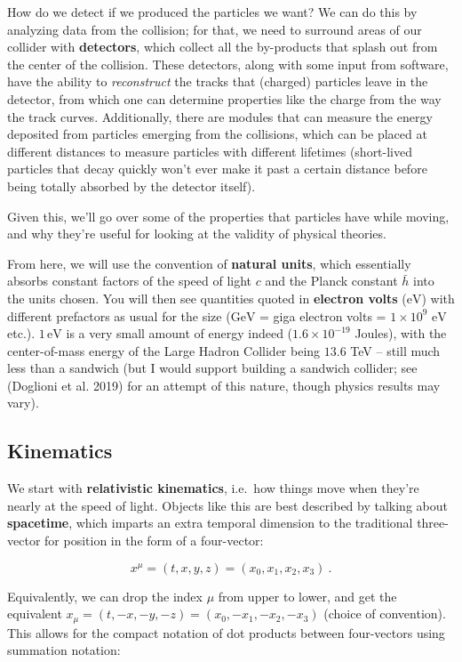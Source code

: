 \documentclass[
  11pt,
  numbers=noendperiod]{book}
\begin{document}
How do we detect if we produced the particles we want? We can do this by
analyzing data from the collision; for that, we need to surround areas
of our collider with \textbf{detectors}, which collect all the
by-products that splash out from the center of the collision. These
detectors, along with some input from software, have the ability to
\emph{reconstruct} the tracks that (charged) particles leave in the
detector, from which one can determine properties like the charge from
the way the track curves. Additionally, there are modules that can
measure the energy deposited from particles emerging from the
collisions, which can be placed at different distances to measure
particles with different lifetimes (short-lived particles that decay
quickly won't ever make it past a certain distance before being totally
absorbed by the detector itself).

Given this, we'll go over some of the properties that particles have
while moving, and why they're useful for looking at the validity of
physical theories.

From here, we will use the convention of \textbf{natural units}, which
essentially absorbs constant factors of the speed of light \(c\) and the
Planck constant \(\bar{h}\) into the units chosen. You will then see
quantities quoted in \textbf{electron volts} (\(\text{eV}\)) with
different prefactors as usual for the size (\(\text{GeV}\) = giga
electron volts = \(1\times 10^9\) \(\text{eV}\) etc.). \(1\,\text{eV}\)
is a very small amount of energy indeed (\(1.6 \times 10^{-19}\)
Joules), with the center-of-mass energy of the Large Hadron Collider
being \(13.6\) TeV -- still much less than a sandwich (but I would
support building a sandwich collider; see (Doglioni et al. 2019) for an
attempt of this nature, though physics results may vary).

\hypertarget{kinematics}{%
\subsection{Kinematics}\label{kinematics}}

We start with \textbf{relativistic kinematics}, i.e.~how things move
when they're nearly at the speed of light. Objects like this are best
described by talking about \textbf{spacetime}, which imparts an extra
temporal dimension to the traditional three-vector for position in the
form of a four-vector:

\[
x^\mu = (t, x, y, z) = (x_0, x_1, x_2, x_3)~.
\]

Equivalently, we can drop the index \(\mu\) from upper to lower, and get
the equivalent \(x_\mu = (t, -x, -y, -z) = (x_0, -x_1, -x_2, -x_3)\)
(choice of convention). This allows for the compact notation of dot
products between four-vectors using summation notation:
\end{document}
